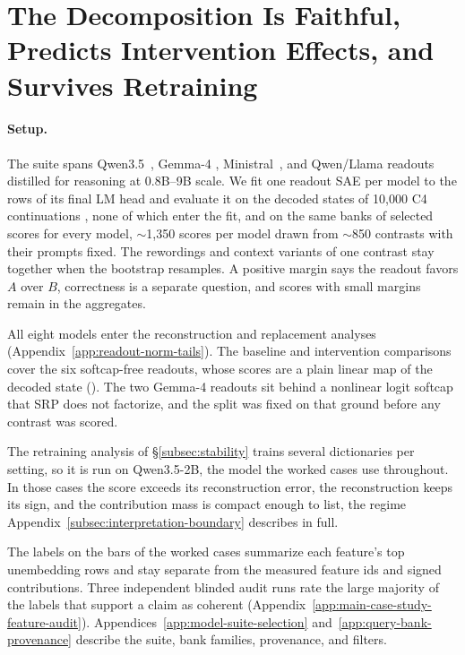 \section{The Decomposition Is Faithful, Predicts Intervention Effects, and Survives Retraining}
\label{sec:results}

\paragraph{Setup.}
The suite spans Qwen3.5~\citep{qwen35collection}, Gemma-4
\citep{gemma4official,gemma4collection}, Ministral~\citep{liu2026ministral3},
and Qwen/Llama readouts distilled for reasoning \citep{deepseekai2025deepseekr1}
at 0.8B--9B scale. We fit one readout SAE per model to the rows of its
final LM head and evaluate it on the decoded states of
10{,}000 C4 continuations
\citep{raffel2020exploring,dodge2021documenting}, none of which enter the
fit, and on the same
banks of selected scores for every model, \(\sim\)1{,}350 scores per model
drawn from \(\sim\)850 contrasts with their prompts fixed. The rewordings
and context variants of one contrast stay together when the bootstrap
resamples. A positive margin
says the readout favors \(A\) over \(B\), correctness is a separate
question, and scores with small margins remain in the aggregates.

All eight models
enter the reconstruction and replacement analyses
(Appendix~\ref{app:readout-norm-tails}). The baseline and
intervention comparisons cover the six softcap-free readouts, whose scores
are a plain linear map of the decoded state
(). The two Gemma-4 readouts
sit behind a nonlinear logit softcap that SRP does not factorize, and
the
split was fixed on that ground before any contrast was scored.

The retraining analysis of \S\ref{subsec:stability} trains several dictionaries per setting, so it
is run on Qwen3.5-2B, the model the worked cases use throughout.
In those cases the score exceeds its reconstruction error, the
reconstruction keeps its sign, and the contribution mass is compact
enough to list, the regime Appendix~\ref{subsec:interpretation-boundary}
describes in full.

The labels on the bars of the worked cases summarize each feature's
top unembedding rows and stay separate from the measured feature ids
and signed contributions. Three independent blinded audit runs
\citep{karvonen2025saebench,makelov2024principled} rate the large
majority of the labels that support a claim as coherent
(Appendix~\ref{app:main-case-study-feature-audit}).
Appendices~\ref{app:model-suite-selection}
and~\ref{app:query-bank-provenance} describe the suite, bank families,
provenance, and filters.

